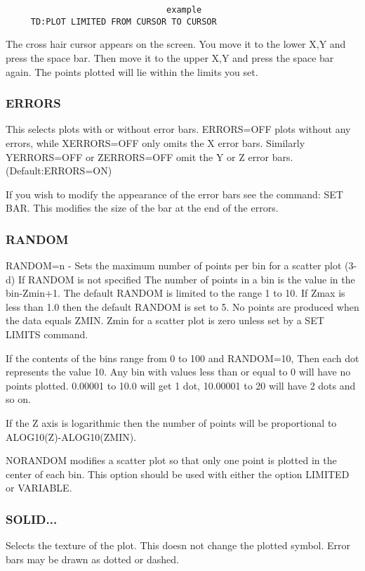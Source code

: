 \begin{verbatim}
                                example
     TD:PLOT LIMITED FROM CURSOR TO CURSOR 
\end{verbatim}
The  cross hair cursor appears on the screen.  You move it to the lower
X,Y and press the space bar.  Then move it to the upper X,Y  and  press
the space bar again.  The points plotted will lie within the limits you
set.  
\subsubsection{ERRORS}
This  selects  plots  with  or  without  error  bars.  ERRORS=OFF plots
without any errors, while XERRORS=OFF only  omits  the  X  error  bars.
Similarly YERRORS=OFF or ZERRORS=OFF omit the Y or Z error bars.  
(Default:ERRORS=ON) 

If you wish to modify the appearance of the error bars see the command:
SET BAR.  This modifies the size of the bar at the end of the errors.  
\subsubsection{RANDOM}
RANDOM=n - Sets the maximum number of points per bin for a scatter plot
(3-d) If RANDOM is not specified The number of points in a bin  is  the
value  in the bin-Zmin+1.  The default RANDOM is limited to the range 1
to 10.  If Zmax is less than 1.0 then the default RANDOM is set  to  5.
No  points  are produced when the data equals ZMIN.  Zmin for a scatter
plot is zero unless set by a SET LIMITS command.  

If  the  contents  of  the bins range from 0 to 100 and RANDOM=10, Then
each dot represents the value 10.  Any bin with  values  less  than  or
equal  to  0  will  have no points plotted.  0.00001 to 10.0 will get 1
dot, 10.00001 to 20 will have 2 dots and so on.  

If  the  Z  axis  is  logarithmic  then  the  number  of points will be
proportional to ALOG10(Z)-ALOG10(ZMIN).  

NORANDOM  modifies  a scatter plot so that only one point is plotted in
the center of each bin.  This option should be  used  with  either  the
option LIMITED or VARIABLE.  
\subsubsection{SOLID...}
Selects  the  texture  of  the plot.  This doesn not change the plotted
symbol.  Error bars may be drawn as dotted or dashed.  
